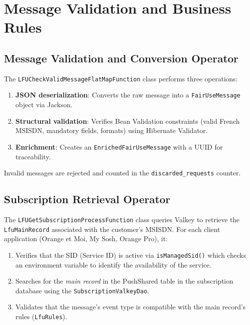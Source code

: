 \section{Message Validation and Business Rules}

\subsection{Message Validation and Conversion Operator}

The \texttt{LFUCheckValidMessageFlatMapFunction} class performs three operations:
\begin{enumerate}
    \item \textbf{JSON deserialization}: Converts the raw message into a \texttt{FairUseMessage} object via Jackson.
    \item \textbf{Structural validation}: Verifies Bean Validation constraints (valid French MSISDN, mandatory fields, formats) using Hibernate Validator.
    \item \textbf{Enrichment}: Creates an \texttt{EnrichedFairUseMessage} with a UUID for traceability.
\end{enumerate}

Invalid messages are rejected and counted in the \texttt{discarded\_requests} counter.

\subsection{Subscription Retrieval Operator}

The \texttt{LFUGetSubscriptionProcessFunction} class queries Valkey to retrieve the \texttt{LfuMainRecord} associated with the customer's MSISDN. For each client application (Orange et Moi, My Sosh, Orange Pro), it:
\begin{enumerate}
    \item Verifies that the SID (Service ID) is active via \texttt{isManagedSid()} which checks an environment variable to identify the availability of the service.
    \item Searches for the \textit{main record} in the PushShared table in the subscription database using the \texttt{SubscriptionValkeyDao}.
    \item Validates that the message's event type is compatible with the main record's rules (\texttt{LfuRules}).
\end{enumerate}

